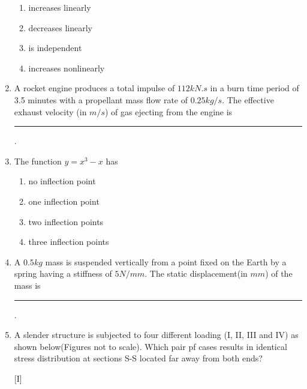 \documentclass[journal,12pt,onecolumn]{IEEEtran}
\theoremstyle{remark}
\begin{document}
\begin{enumerate}
   \begin{enumerate}
  \item increases linearly
  \item decreases linearly 
  \item is independent
  \item increases nonlinearly
  \end{enumerate}
 \item A rocket engine produces a total impulse of $112 kN.s$ in a burn time period of 3.5 minutes with a propellant mass flow rate of $0.25 kg/s$. The effective exhaust velocity (in $m/s$) of gas ejecting from the engine is \rule{2.5cm}{0.4pt}.
\item The function $y=x^3-x$ has
\begin{enumerate}
\item no inflection point
\item one inflection point
\item two inflection points
\item three inflection points
\end{enumerate}
\item A $0.5 kg$ mass is suspended vertically from a point fixed on the Earth by a spring having a stiffness of $5 N/mm$. The static displacement(in $mm$) of the mass is \rule{2.5cm}{0.4pt}.

\item A slender structure is subjected to four different loading (I, II, III and IV) as shown below(Figures not to scale). Which pair pf cases results in identical stress distribution at sections S-S located far away from both ends?

[I]
\begin{figure}[!ht]
%

\label{fig:my_label}
\end{figure}


\end{enumerate}
\end{document}
